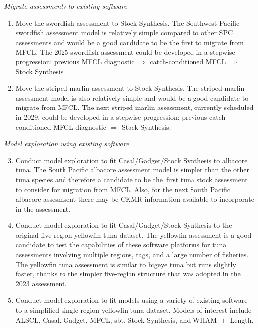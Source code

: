 \documentclass{SCreport}
\begin{document}
\textit{Migrate assessments to existing software}

\begin{enumerate}
  \item Move the swordfish assessment to Stock Synthesis. The Southwest Pacific
  swordfish assessment model is relatively simple compared to other SPC
  assessments and would be a good candidate to be the first to migrate from
  MFCL. The 2025 swordfish assessment could be developed in a stepwise
  progression: previous MFCL diagnostic $\Rightarrow$ catch-conditioned MFCL
  $\Rightarrow$ Stock Synthesis.
  \item Move the striped marlin assessment to Stock Synthesis. The striped
  marlin assessment model is also relatively simple and would be a good
  candidate to migrate from MFCL. The next striped marlin assessment, currently
  scheduled in 2029, could be developed in a stepwise progression: previous
  catch-conditioned MFCL diagnostic $\Rightarrow$ Stock Synthesis.
\end{enumerate}

\textit{Model exploration using existing software}

\begin{enumerate}\setcounter{enumi}{2}
  \item Conduct model exploration to fit Casal/Gadget/Stock Synthesis to
  albacore tuna. The South Pacific albacore assessment model is simpler than the
  other tuna species and therefore a candidate to be the~first tuna stock
  assessment to consider for migration from MFCL. Also, for the next South
  Pacific albacore assesmsent there may be CKMR information available to
  incorporate in the assessment.
  \item Conduct model exploration to fit Casal/Gadget/Stock Synthesis to the
  original five-region yellowfin tuna dataset. The yellowfin assessment is a
  good candidate to test the capabilities of these software platforms for tuna
  assessments involving multiple regions, tags, and a large number of fisheries.
  The yellowfin tuna assessment is similar to bigeye tuna but runs slightly
  faster, thanks to the simpler \mbox{five-region} structure that was adopted in
  the 2023 assessment.
  \item Conduct model exploration to fit models using a variety of existing
  software to a simplified single-region yellowfin tuna dataset. Models of
  interest include ALSCL, Casal, Gadget, MFCL, sbt, Stock Synthesis, and
  WHAM $\!+\!$ Length.
\end{enumerate}
\end{document}
